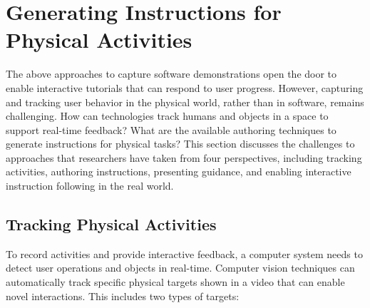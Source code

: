 



\section{Generating Instructions for Physical Activities}
\label{related_physical}

The above approaches to capture software demonstrations open the door to enable interactive tutorials that can respond to user progress. However, capturing and tracking user behavior in the physical world, rather than in software, remains challenging.
%
How can technologies track humans and objects in a space to support real-time feedback? What are the available authoring techniques to generate instructions for physical tasks?
%
This section discusses the challenges to approaches that researchers have taken from four perspectives, including tracking activities, authoring instructions, presenting guidance, and enabling interactive instruction following in the real world.


\subsection{Tracking Physical Activities}
To record activities and provide interactive feedback, a computer system needs to detect user operations and objects in real-time.
%
Computer vision techniques can automatically track specific physical targets shown in a video that can enable novel interactions. This includes two types of targets:

